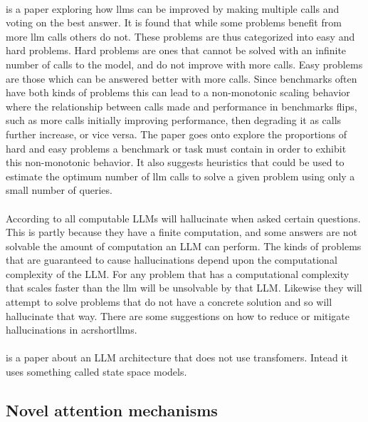 \paragraph{}\cite{chen_are_2024} is a paper exploring how \acrshort{llm}s can be improved by making multiple calls and voting on the best answer. It is found that while some problems benefit from more \acrshort{llm} calls others do not. These problems are thus categorized into easy and hard problems. Hard problems are ones that cannot be solved with an infinite number of calls to the model, and do not improve with more calls. Easy problems are those which can be answered better with more calls. Since benchmarks often have both kinds of problems this can lead to a non-monotonic scaling behavior where the relationship between calls made and performance in benchmarks flips, such as more calls initially improving performance, then degrading it as calls further increase, or vice versa. The paper goes onto explore the proportions of hard and easy problems a benchmark or task must contain in order to exhibit this non-monotonic behavior. It also suggests heuristics that could be used to estimate the optimum number of \acrshort{llm} calls to solve a given problem using only a small number of queries.

\paragraph{}According to \autocite{xu_hallucination_2025} all computable LLMs will hallucinate when asked certain questions. This is partly because they have a finite computation, and some answers are not solvable the amount of computation an LLM can perform. The kinds of problems that are guaranteed to cause hallucinations depend upon the computational complexity of the LLM. For any problem that has a computational complexity that scales faster than the \acrshort{llm} will be unsolvable by that LLM. Likewise they will attempt to solve problems that do not have a concrete solution and so will hallucinate that way. There are some suggestions on how to reduce or mitigate hallucinations in acrshort{llm}s.

\paragraph{}\cite{gu_mamba_2024} is a paper about an LLM architecture that does not use transfomers. Intead it uses something called state space models.

\subsection{Novel attention mechanisms}


